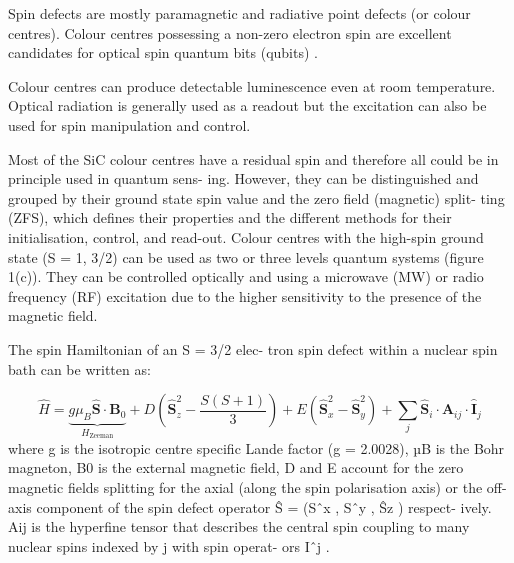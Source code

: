 Spin defects are mostly paramagnetic and radiative point defects (or colour centres). Colour centres possessing a 
non-zero electron spin are excellent candidates for optical spin
quantum bits (qubits) \cite{Castelletto_2024}.

Colour centres can produce detectable luminescence even at room temperature. Optical radiation is generally used as a readout but the excitation can also be used for spin manipulation and control.

\begin{group}
\color{lightgray}
Most of the SiC colour centres have a residual spin and
therefore all could be in principle used in quantum sens-
ing. However, they can be distinguished and grouped by their
ground state spin value and the zero field (magnetic) split-
ting (ZFS), which defines their properties and the different
methods for their initialisation, control, and read-out. Colour
centres with the high-spin ground state (S = 1, 3/2) can be
used as two or three levels quantum systems (figure 1(c)). They
can be controlled optically and using a microwave (MW) or
radio frequency (RF) excitation due to the higher sensitivity to
the presence of the magnetic field.


The spin Hamiltonian of an S = 3/2 elec-
tron spin defect within a nuclear spin bath can be written as:

\begin{equation}
    \hat{H} = \underbrace{g \mu_B \hat{\mathbf{S}} \cdot \mathbf{B}_0}_{H_{\text{Zeeman}}} + D \left( \hat{\mathbf{S}}_z^2 - \frac{S(S+1)}{3}\right) + E (\hat{\mathbf{S}}^2_x - \hat{\mathbf{S}}^2_y) + \sum_j \hat{\mathbf{S}}_i \cdot \mathbf{A}_{ij} \cdot \hat{\mathbf{I}}_j
    \label{eq:}
\end{equation}
where g is the isotropic centre specific Lande factor (g =
2.0028), µB is the Bohr magneton, B0 is the external magnetic
field, D and E account for the zero magnetic fields splitting
for the axial (along the spin polarisation axis) or the off-axis
component of the spin defect operator Ŝ = (Sˆx , Sˆy , Ŝz ) respect-
ively. Aij is the hyperfine tensor that describes the central spin
coupling to many nuclear spins indexed by j with spin operat-
ors Iˆj .
\end{group}


